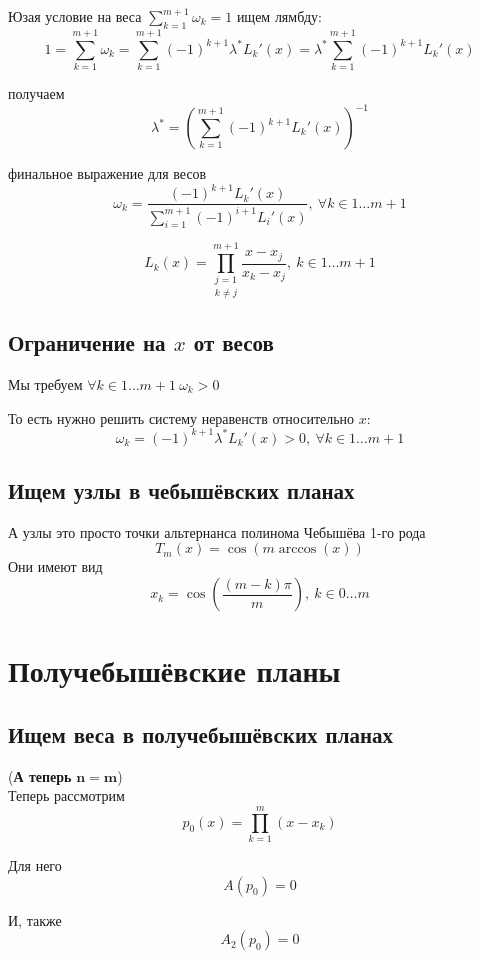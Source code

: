 \documentclass[12pt,a4paper]{article}
\begin{document}
	
	\noindent Юзая условие на веса $\sum_{k=1}^{m+1} \omega_k = 1$ ищем лямбду:
	\[
	1 = \sum_{k=1}^{m+1} \omega_k = \sum_{k=1}^{m+1} (-1)^{k+1} \lambda^* L_k'(x) = \lambda^* \sum_{k=1}^{m+1} (-1)^{k+1}  L_k'(x)
	\]
	
	\noindent получаем
	\[
	\lambda^* = \left( \sum_{k=1}^{m+1} (-1)^{k+1}  L_k'(x) \right) ^ {-1}
	\]
	
	\noindent финальное выражение для весов
	\[
	\omega_k  = 
	\frac
	{
		(-1)^{k+1} L_k'(x)
	}
	{
		\sum_{i=1}^{m+1} (-1)^{i+1}  L_i'(x)
	}, \ \forall k \in 1 \ldots m+1 
	\]
	
	\[
	L_k(x) = \underset{k \neq j}{\prod_{j=1}^{m+1}} \frac{x - x_j}{x_k - x_j}, \ k \in 1 \ldots m+1
	\]
	
	\subsection{Ограничение на $x$ от весов}
	
	Мы требуем $\forall k \in 1 \ldots m+1 \ \omega_k > 0 $
	
	\noindent То есть нужно решить систему неравенств относительно $x$:
	\[
	\omega_k  = (-1)^{k+1} \lambda^* L_k'(x)  > 0 , \ \forall k \in 1 \ldots m+1 
	\]
	
	
	
	\subsection{Ищем узлы в чебышёвских планах}
	
	\noindent А узлы это просто точки альтернанса полинома Чебышёва 1-го рода 
	\[
	T_{m}(x) = \cos( m \arccos(x))
	\]
	\noindent Они имеют вид 
	\[
	x_k = \cos \left( \frac{(m-k) \pi}{m} \right), \ k \in 0 \ldots m
	\]
	
	
	
	\newpage
	\section{Получебышёвские планы}
	\subsection{Ищем веса в получебышёвских планах}
	\noindent (\textbf{А теперь} $\mathbf{n = m}$)\\ 
	Теперь рассмотрим 
	\[
	p_0(x) = \prod_{k=1}^{m} (x-x_k)
	\]
	
	\noindent Для него
	\[A(p_0) = 0\]
	
	\noindent И, также 
	\[A_2(p_0) = 0\]
	
\end{document}
